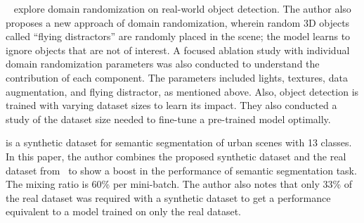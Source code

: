 ~\cite{Tremblay2018TrainingDN}  explore domain randomization on real-world object detection.
The author also proposes a new approach of domain randomization, wherein random 3D objects called ``flying distractors” are randomly placed in the scene;
the model learns to ignore objects that are not of interest.
A focused ablation study with individual domain randomization parameters was also conducted to understand the contribution of each component.
The parameters included lights, textures, data augmentation, and flying distractor, as mentioned above.
Also, object detection is trained with varying dataset sizes to learn its impact.
They also conducted a study of the dataset size needed to fine-tune a pre-trained model optimally.

\cite{synthia} is a synthetic dataset for semantic segmentation of urban scenes with 13 classes.
In this paper, the author combines the proposed synthetic dataset and the real dataset from~\cite{Geiger2012CVPR,Russell2008,BrostowSFC:ECCV08} to show a boost in the performance of semantic segmentation task.
The mixing ratio is 60\% per mini-batch.
The author also notes that only 33\% of the real dataset was required with a synthetic dataset to get a performance equivalent to a model trained on only the real dataset.
